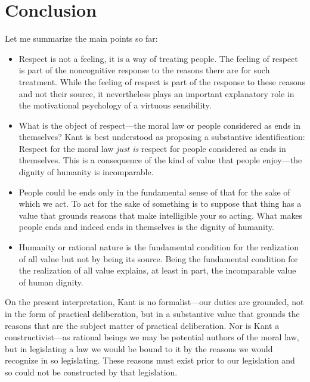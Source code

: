 \documentclass[12pt]{article}
\begin{document}


\section{Conclusion} \label{sec:conclusion} %

Let me summarize the main points so far: 
\begin{itemize}
	\item Respect is not a feeling, it is a way of treating people. The feeling of respect is part of the noncognitive response to the reasons there are for such treatment. While the feeling of respect is part of the response to these reasons and not their source, it nevertheless plays an important explanatory role in the motivational psychology of a virtuous sensibility. 
	\item What is the object of respect---the moral law or people considered as ends in themselves? Kant is best understood as proposing a substantive identification: Respect for the moral law \emph{just is} respect for people considered as ends in themselves. This is a consequence of the kind of value that people enjoy---the dignity of humanity is incomparable. 
	\item People could be ends only in the fundamental sense of that for the sake of which we act. To act for the sake of something is to suppose that thing has a value that grounds reasons that make intelligible your so acting. What makes people ends and indeed ends in themselves is the dignity of humanity. 
	\item Humanity or rational nature is the fundamental condition for the realization of all value but not by being its source. Being the fundamental condition for the realization of all value explains, at least in part, the incomparable value of human dignity. 
\end{itemize}
On the present interpretation, Kant is no formalist---our duties are grounded, not in the form of practical deliberation, but in a substantive value that grounds the reasons that are the subject matter of practical deliberation. Nor is Kant a constructivist---as rational beings we may be potential authors of the moral law, but in legislating a law we would be bound to it by the reasons we would recognize in so legislating. These reasons must exist prior to our legislation and so could not be constructed by that legislation. 
\end{document}
